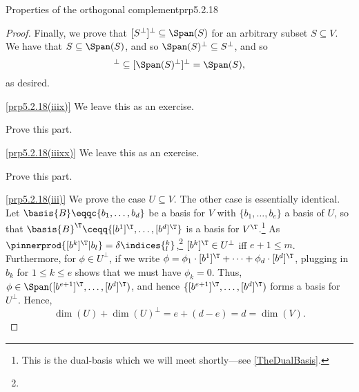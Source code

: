 \begin{prp}{Properties of the orthogonal complement}{prp5.2.18}
\begin{proof}
		Finally, we prove that $[S^{\perp}]^{\perp}\subseteq \Span (S)$ for an arbitrary subset $S\subseteq V$.  We have that $S\subseteq \Span (S)$, and so $\Span (S)^{\perp}\subseteq S^{\perp}$, and so
		\begin{equation}
		[S^{\perp}]^{\perp}\subseteq [\Span (S)^{\perp}]^{\perp}=\Span (S),
		\end{equation}
		as desired.
		
		\blni
		\cref{prp5.2.18(iiix)} We leave this as an exercise.
		\begin{exr}[breakable=false]{}{}
			Prove this part.
		\end{exr}
		
		\blni
		\cref{prp5.2.18(iiixx)} We leave this as an exercise.
		\begin{exr}[breakable=false]{}{}
			Prove this part.
		\end{exr}
		
		\blni
		\cref{prp5.2.18(iii)} We prove the case $U\subseteq V$.  The other case is essentially identical.  Let $\basis{B}\eqqc \{ b_1,\ldots ,b_d\}$ be a basis for $V$ with $\{ b_1,\ldots ,b_e\}$ a basis of $U$, so that $\basis{B}^{\T}\ceqq \{ [b^1]^{\T},\ldots ,[b^d]^{\T}\}$ is a basis for $V^{\T}$.\footnote{This is the dual-basis which we will meet shortly---see \cref{TheDualBasis}.}  As $\pinnerprod{[b^k]^{\T}|b_l}=\delta \indices{^k_l}$,\footnote{} $[b^k]^{\T}\in U^{\perp}$ iff $e+1\leq m$.  Furthermore, for $\phi \in U^{\perp}$, if we write $\phi =\phi _1\cdot [b^1]^{\T}+\cdots +\phi _d\cdot [b^d]^{\T}$, plugging in $b_k$ for $1\leq k\leq e$ shows that we must have $\phi _k=0$.  Thus, $\phi \in \Span ([b^{e+1}]^{\T},\ldots ,[b^d]^{\T})$, and hence $\{ [b^{e+1}]^{\T},\ldots ,[b^d]^{\T})$ forms a basis for $U^{\perp}$.  Hence,
		\begin{equation}
			\dim (U)+\dim (U)^{\perp}=e+(d-e)=d=\dim (V).
		\end{equation}
	\end{proof}
\end{prp}
